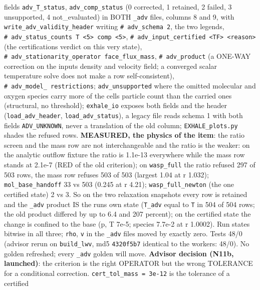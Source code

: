\documentclass[english,a4paper]{my_memo}
\begin{document}
\begin{itemize}
{  fields} \texttt{adv\_T\_status}, \texttt{adv\_comp\_status} (0 corrected, 1 retained, 2
  failed, 3 unsupported, 4 not\_evaluated) in BOTH \texttt{\_adv} files, columns 8
  and 9, with \texttt{write\_adv\_validity\_header} writing \texttt{\#\ adv\_schema\ 2}, the two
  legends, \texttt{\#\ adv\_status\_counts\ T\ \textless{}5\textgreater{}\ comp\ \textless{}5\textgreater{}}, \texttt{\#\ adv\_input\_certified\ \textless{}T\textbar{}F\textgreater{}\ \textless{}reason\textgreater{}} (the certification\textquotesingle s verdict on this very state),
  \texttt{\#\ adv\_stationarity\_operator\ face\_flux\_mass}, \texttt{\#\ adv\_product} (a ONE-WAY
  correction on the input\textquotesingle s density and velocity field; a converged scalar
  temperature solve does not make a row self-consistent), \texttt{\#\ adv\_model\_\ restrictions}; \texttt{adv\_unsupported} where the omitted molecular and oxygen
  species carry more of the cell\textquotesingle s particle count than the carried ones
  (structural, no threshold); \texttt{exhale\_io} exposes both fields and the header
  (\texttt{load\_adv\_header}, \texttt{load\_adv\_status}), a legacy file reads schema 1 with
  both fields \texttt{ADV\_UNKNOWN}, never a translation of the old column;
  \texttt{EXHALE\_plots.py} shades the refused rows. \textbf{MEASURED, the physics of the
  item}: the ratio screen and the mass row are not interchangeable and the
  ratio is the weaker: on the analytic outflow fixture the ratio is 1.1e-13
  everywhere while the mass row stands at 2.1e-7 (RED of the old
  criterion); on \texttt{wasp\_full} the ratio refused 297 of 503 rows, the mass row
  refuses 503 of 503 (largest 1.04 at r 1.032); \texttt{mol\_base\_handoff} 33 vs
  503 (0.245 at r 4.21); \texttt{wasp\_full\_newton} (the one certified state) 2 vs
  3. So on the two relaxation snapshots every row is retained and the \texttt{\_adv}
  product IS the run\textquotesingle s own state (\texttt{T\_adv} equal to \texttt{T} in 504 of 504 rows;
  the old product differed by up to 6.4 and 207 percent); on the certified
  state the change is confined to the base (p, T 7e-5; species 7.7e-2 at r
  1.0002). Run states bitwise in all three; \texttt{rho}, \texttt{v} in the \texttt{\_adv} files
  moved by exactly zero. Tests 48/0 (advisor rerun on \texttt{build\_lwv}, md5
  \texttt{4320f5b7} identical to the worker\textquotesingle s: 48/0). No golden refreshed; every
  \texttt{\_adv} golden will move. \textbf{Advisor decision (N11b, launched)}: the
  criterion is the right OPERATOR but the wrong TOLERANCE for a conditional
  correction. \texttt{cert\_tol\_mass\ =\ 3e-12} is the tolerance of a certified

\end{itemize}
\end{document}
